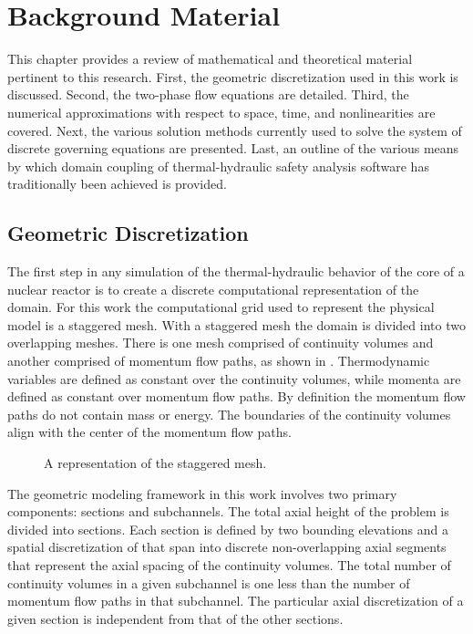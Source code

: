 \chapter{Background Material}
\label{chap:background}
This chapter provides a review of mathematical and theoretical material pertinent to this research.
First, the geometric discretization used in this work is discussed.
Second, the two-phase flow equations are detailed.
Third, the numerical approximations with respect to space, time, and nonlinearities are covered.
Next, the various solution methods currently used to solve the system of discrete governing equations are presented.
Last, an outline of the various means by which domain coupling of thermal-hydraulic safety analysis software has traditionally been achieved is provided.

\section{Geometric Discretization}
\label{sect:geometry}
The first step in any simulation of the thermal-hydraulic behavior of the core of a nuclear reactor is to create a discrete computational representation of the domain.
For this work the computational grid used to represent the physical model is a staggered mesh.
With a staggered mesh the domain is divided into two overlapping meshes.
There is one mesh comprised of continuity volumes and another comprised of momentum flow paths, as shown in .
Thermodynamic variables are defined as constant over the continuity volumes, while momenta are defined as constant over momentum flow paths.
By definition the momentum flow paths do not contain mass or energy.
The boundaries of the continuity volumes align with the center of the momentum flow paths.

\begin{figure}[ht!]
\centering

\caption{A representation of the staggered mesh.}
\label{fig:staggered_mesh}
\end{figure}

The geometric modeling framework in this work involves two primary components: sections and subchannels.
The total axial height of the problem is divided into sections.
Each section is defined by two bounding elevations and a spatial discretization of that span into discrete non-overlapping axial segments that represent the axial spacing of the continuity volumes.
The total number of continuity volumes in a given subchannel is one less than the number of momentum flow paths in that subchannel.
The particular axial discretization of a given section is independent from that of the other sections.

